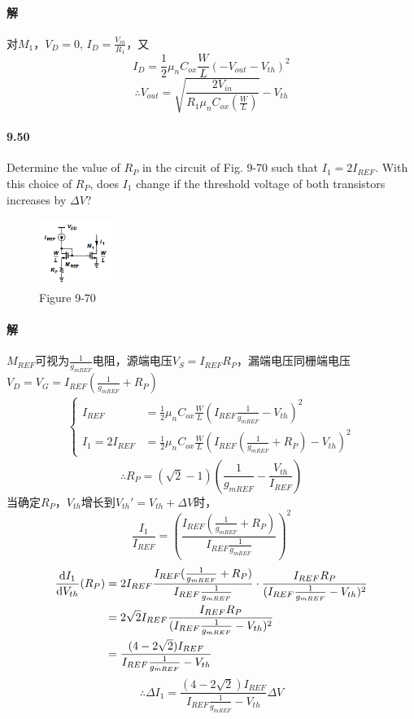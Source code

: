 \documentclass[hyperref, UTF8]{ctexart}
\newcommand{\under}[1]{\frac{1}{#1}}
\newcommand{\D}{{\rm d}}
\begin{document}
\paragraph{解}
    对$M_1$，$V_D = 0$, $I_D = \frac{V_{in}}{R_1}$，又
    $$I_D = \frac{1}{2} \mu_n C_{ox} \frac{W}{L} (-V_{out}-V_{th})^2$$
    $$\therefore V_{out} = \sqrt{\frac{2V_{in}}{R_1\mu_n C_{ox} (\frac{W}{L})}} - V_{th}$$

\paragraph{9.50} \label{9.50}
    Determine the value of $R_P$ in the circuit of Fig. 9-70 such that $I_1 = 2I_{REF}$. With this choice of $R_P$, does $I_1$ change if the threshold voltage of both transistors increases by $\Delta V$?

    \begin{figure}[!htb]
        \centering
        \includegraphics[width=0.213\textwidth]{p9-70.png}
        \caption*{Figure 9-70}
    \end{figure}        

\paragraph{解}
    $M_{REF}$可视为$\under{g_{mREF}}$电阻，源端电压$V_S = I_{REF}R_P$，漏端电压同栅端电压$V_D = V_G=I_{REF}(\under{g_{mREF}}+R_P)$
    \begin{gather*}\left\{\begin{aligned}
        I_{REF} & = \frac{1}{2} \mu_n C_{ox} \frac{W}{L}(I_{REF}\under{g_{mREF}}-V_{th})^2 \\
        I_1 = 2I_{REF} &= \frac{1}{2} \mu_n C_{ox} \frac{W}{L}(I_{REF}(\under{g_{mREF}}+R_P)-V_{th})^2
    \end{aligned}\right.\end{gather*}
    $$\therefore R_P = (\sqrt 2 - 1)(\under{g_{mREF}} - \frac{V_{th}}{I_{REF}})$$
    当确定$R_P$，$V_{th}$增长到$V_{th}' = V_{th}+\Delta V$时，
    $$\frac{I_1}{I_{REF}} = \left(\frac{I_{REF}(\under{g_{mREF}}+R_P)}{I_{REF}\under{g_{mREF}}}\right)^2$$
    \begin{align*}
        \frac{\D I_1}{\D V_{th}}(R_P) & = 2I_{REF} \frac{I_{REF}(\under{g_{mREF}}+R_P)}{I_{REF}\under{g_{mREF}}} \cdot \frac{I_{REF}R_P}{(I_{REF}\under{g_{mREF}}-V_{th})^2} \\
        & = 2\sqrt 2I_{REF}\frac{I_{REF}R_P}{(I_{REF}\under{g_{mREF}}-V_{th})^2} \\
        & = \frac{(4-2\sqrt 2)I_{REF}}{I_{REF}\under{g_{mREF}}-V_{th}}
    \end{align*}
    $$\therefore \Delta I_1 = \frac{(4-2\sqrt 2)I_{REF}}{I_{REF}\under{g_{mREF}}-V_{th}} \Delta V$$
\end{document}
